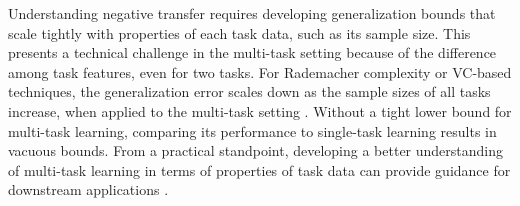 Understanding negative transfer requires developing generalization bounds that scale tightly with properties of each task data, such as its sample size.
This presents a technical challenge in the multi-task setting because of the difference among task features, even for two tasks.
For Rademacher complexity or VC-based techniques, the generalization error scales down as the sample sizes of all tasks increase, when applied to the multi-task setting \cite{B00,AZ05,M06,MPR16,WZR20}.
Without a tight lower bound for multi-task learning, comparing its performance to single-task learning results in vacuous bounds.
From a practical standpoint, developing a better understanding of multi-task learning in terms of properties of task data can provide guidance for downstream applications \cite{RH19}.

